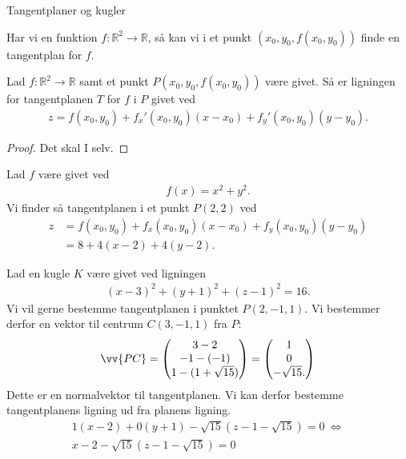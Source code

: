 
\begin{center}
\Huge
Tangentplaner og kugler
\end{center}

Har vi en funktion $f:\mathbb{R}^2 \to \mathbb{R}$, så kan vi i et punkt $(x_0,y_0,f(x_0,y_0))$ finde en tangentplan for $f$. 
\begin{setn}[Tangentplan]
	Lad $f:\mathbb{R}^2 \to \mathbb{R}$ samt et punkt $P(x_0,y_0,f(x_0,y_0))$ være givet. Så er ligningen for tangentplanen $T$ for $f$ i $P$ givet ved
	\begin{align*}
		z = f(x_0,y_0) + f_x'(x_0,y_0)(x-x_0) + f_y'(x_0,y_0)(y-y_0).
	\end{align*}
\end{setn}
\begin{proof}
Det skal I selv.
\end{proof}
\begin{exa}
	Lad $f$ være givet ved
	\begin{align*}
		f(x) = x^2 + y^2.
	\end{align*}
	Vi finder så tangentplanen i et punkt $P(2,2)$ ved
	\begin{align*}
		z &= f(x_0,y_0) + f_x(x_0,y_0)(x-x_0) + f_y(x_0,y_0)(y-y_0)\\
		&= 8 + 4(x-2) + 4(y-2).
	\end{align*}
\end{exa}

\begin{exa}
	Lad en kugle $K$ være givet ved ligningen
	\begin{align*}
		(x-3)^2 + (y+1)^2 + (z-1)^2 = 16.
	\end{align*}
	Vi vil gerne bestemme tangentplanen i punktet $P(2,-1,1)$. Vi bestemmer derfor en vektor til centrum $C(3,-1,1)$ fra $P$:
	\begin{align*}
		\vv{PC} = 
		\begin{pmatrix}
			3-2 \\ -1-(-1) \\ 1-(1+\sqrt{15}) 
		\end{pmatrix}=
		\begin{pmatrix}
			1 \\ 0 \\ -\sqrt{15}. 
		\end{pmatrix}
	\end{align*}
	Dette er en normalvektor til tangentplanen. Vi kan derfor bestemme tangentplanens ligning ud fra planens ligning.
	\begin{align*}
		1(x-2) + 0(y+1) - \sqrt{15}(z-1-\sqrt{15}) = 0 \ \Leftrightarrow	\\
		x-2-\sqrt{15}(z-1-\sqrt{15}) = 0
	\end{align*}
\end{exa}

